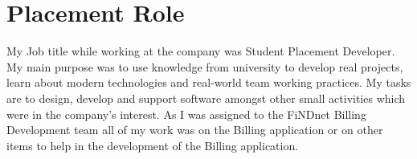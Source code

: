 \section{Placement Role}{
	My Job title while working at the company was Student Placement Developer. My main purpose was to use knowledge from university to develop real projects, learn about modern technologies and real-world team working practices. My tasks are to design, develop and support software amongst other small activities which were in the company's interest. As I was assigned to the FiNDnet Billing Development team all of my work was on the Billing application or on other items to help in the development of the Billing application.
}